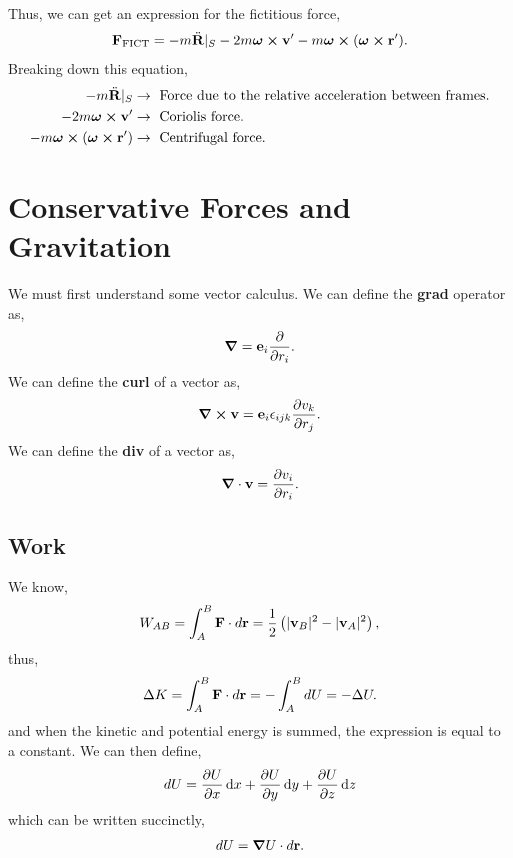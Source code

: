 \documentclass{book}
\begin{document}
Thus, we can get an expression for the fictitious force,
\begin{equation}
    \vb{F}_{\text{FICT}} = -m\Ddot{\vb{R}}|_S - 2m\vb*{\omega}\cross\vb{v}' -m\vb*{\omega}\cross(\vb*{\omega}\cross\vb{r}').
\end{equation}
Breaking down this equation,
\begin{align}
    -m\Ddot{\vb{R}}|_S &\to \text{ Force due to the relative acceleration between frames.} \\
    - 2m\vb*{\omega}\cross\vb{v}' & \to \text{ Coriolis force.} \\
    -m\vb*{\omega}\cross(\vb*{\omega}\cross\vb{r}') & \to \text{ Centrifugal force.}
\end{align}

\chapter{Conservative Forces and Gravitation}
We must first understand some vector calculus. We can define the \textbf{grad} operator as,
\begin{equation}
    \grad = \vb{e}_i\pdv{}{r_i}.
\end{equation}
We can define the \textbf{curl} of a vector as,
\begin{equation}
    \grad \cross \vb{v} = \vb{e}_i \epsilon_{ijk}\pdv{v_k}{r_j}.
\end{equation}
We can define the \textbf{div} of a vector as,
\begin{equation}
    \grad\cdot\vb{v} = \pdv{v_i}{r_i}.
\end{equation}
\section{Work}
We know,
\begin{equation}
    W_{AB} = \int_A^B \vb{F}\cdot d\vb{r} = \frac{1}{2}\left(|\vb{v}_B|^2 - |\vb{v}_A|^2\right),
\end{equation}
thus,
\begin{equation}
    \Delta K = \int_A^B\vb{F}\cdot d\vb{r} = -\int_A^BdU = -\Delta U.
\end{equation}
and when the kinetic and potential energy is summed, the expression is equal to a constant. We can then define,
\begin{equation}
    dU = \pdv{U}{x}\dd{x} + \pdv{U}{y}\dd{y}+\pdv{U}{z}\dd{z}
\end{equation}
which can be written succinctly,
\begin{equation}
    dU = \grad U \cdot d\vb{r}.
\end{equation}
\end{document}
